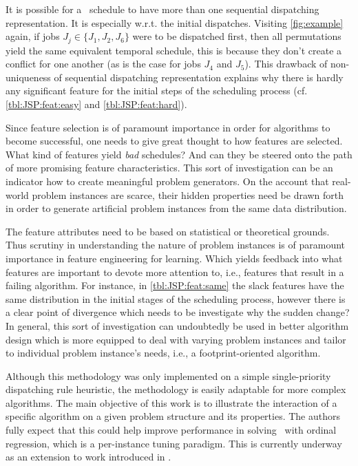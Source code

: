 It is possible for a \JSP\ schedule to have more than one sequential dispatching representation. It is especially w.r.t. the initial dispatches. Visiting \cref{fig:example} again, if jobs $J_j\in\{J_1,J_2,J_6\}$ were to be dispatched first, then all permutations yield the same equivalent temporal schedule, this is because they don't create a conflict for one another (as is the case for jobs $J_4$ and $J_5$). This drawback of non-uniqueness of sequential dispatching representation explains why there is hardly any significant feature for the initial steps of the scheduling process (cf. \cref{tbl:JSP:feat:easy} and \cref{tbl:JSP:feat:hard}). 

Since feature selection is of paramount importance in order for algorithms to become successful, one needs to give great thought to how features are selected. What kind of features yield \emph{bad} schedules? And can they be steered onto the path of more promising feature characteristics. This sort of investigation can be an indicator how to create meaningful problem generators. On the account that real-world problem instances are scarce, their hidden properties need be drawn forth in order to generate artificial problem instances from the same data distribution. 

The feature attributes need to be based on statistical or theoretical grounds. Thus scrutiny in understanding the nature of problem instances is of paramount importance in feature engineering for learning. Which yields feedback into what features are important to devote more attention to, i.e., features that result in a failing algorithm. For instance, in \cref{tbl:JSP:feat:same} the slack features have the same distribution in the initial stages of the scheduling process, however there is a clear point of divergence which needs to be investigate why the sudden change? 
In general, this sort of investigation can undoubtedly be used in better algorithm design which is more equipped to deal with varying problem instances and tailor to individual problem instance's needs, i.e., a footprint-oriented algorithm. 

Although this methodology was only implemented on a simple single-priority dispatching rule heuristic, the methodology is easily adaptable for more complex algorithms. The main objective of this work is to illustrate the interaction of a specific algorithm on a given problem structure and its properties.
The authors fully expect that this could help improve performance in solving \JSP\ with ordinal regression, which is a per-instance tuning paradigm. This is currently underway as an extension to work introduced in \cite{InRu11a}.


